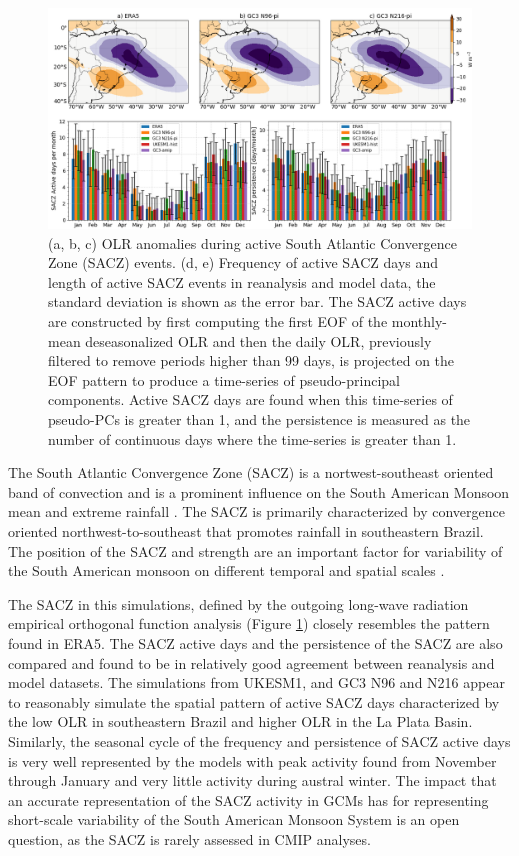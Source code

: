 \begin{figure}[t!]
\includegraphics[width=\linewidth]{figures/saczanalysis.png}
\caption[SACZ assessment in UKESM1 and HadGEM3]{(a, b, c) OLR anomalies during active South Atlantic Convergence Zone (SACZ) events. (d, e) Frequency of active SACZ days and length of active SACZ events in reanalysis and model data, the standard deviation is shown as the error bar. The SACZ active days are constructed by first computing the first EOF of the monthly-mean deseasonalized OLR and then the daily OLR, previously filtered to remove periods higher than 99 days, is projected on the EOF pattern to produce a time-series of pseudo-principal components. Active SACZ days are found when this time-series of pseudo-PCs is greater than 1, and the persistence is measured as the number of continuous days where the time-series is greater than 1.}
\label{fig:sacz}
\end{figure}

 The South Atlantic Convergence Zone (SACZ) is a nortwest-southeast oriented band of convection and is a prominent influence on the South American Monsoon mean and extreme rainfall \citep{carvalho2004,marengo2012,jorgetti2014}. The SACZ is primarily characterized by convergence oriented northwest-to-southeast that promotes rainfall in southeastern Brazil. The position of the SACZ and strength are an important factor for variability of the South American monsoon on different temporal and spatial scales \citep{carvalho2004,marengo2012,jorgetti2014}. 
 
 The SACZ in this simulations, defined by the outgoing long-wave radiation empirical orthogonal function analysis (Figure \ref{fig:sacz}) closely resembles the pattern found in ERA5. The SACZ active days and the persistence of the SACZ are also compared and found to be in relatively good agreement between reanalysis and model datasets.
The simulations from UKESM1, and GC3 N96 and N216 appear to reasonably simulate the spatial pattern of active SACZ days characterized by the low OLR in southeastern Brazil and higher OLR in the La Plata Basin. Similarly, the seasonal cycle of the frequency and persistence of SACZ active days is very well represented by the models with peak activity found from November through January and very little activity during austral winter. The impact that an accurate representation of the SACZ activity in GCMs has for representing short-scale variability of the South American Monsoon System is an open question, as the SACZ is rarely assessed in CMIP analyses.




